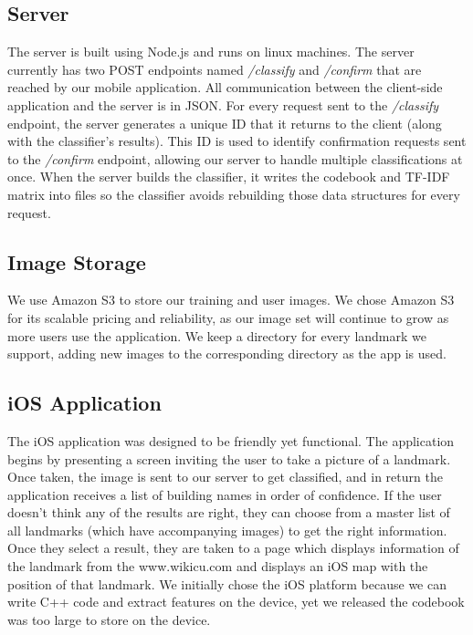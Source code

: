 \subsection{Server}
The server is built using Node.js and runs on linux machines. The server currently has two POST endpoints named \textit{/classify} and \textit{/confirm} that are reached by our mobile application. All communication between the client-side application and the server is in JSON. For every request sent to the \textit{/classify} endpoint, the server generates a unique ID that it returns to the client (along with the classifier's results). This ID is used to identify confirmation requests sent to the \textit{/confirm} endpoint, allowing our server to handle multiple classifications at once. When the server builds the classifier, it writes the codebook and TF-IDF matrix into files so the classifier avoids rebuilding those data structures for every request.

\subsection{Image Storage}
We use Amazon S3 to store our training and user images. We chose Amazon S3 for its scalable pricing and reliability, as our image set will continue to grow as more users use the application. We keep a directory for every landmark we support, adding new images to the corresponding directory as the app is used. 

\subsection{iOS Application}
The iOS application was designed to be friendly yet functional. The application begins by presenting a screen inviting the user to take a picture of a landmark. Once taken, the image is sent to our server to get classified, and in return the application receives a list of building names in order of confidence. If the user doesn't think any of the results are right, they can choose from a master list of all landmarks (which have accompanying images) to get the right information. Once they select a result, they are taken to a page which displays information of the landmark from the www.wikicu.com and displays an iOS map with the position of that landmark. We initially chose the iOS platform because we can write C++ code and extract features on the device, yet we released the codebook was too large to store on the device.